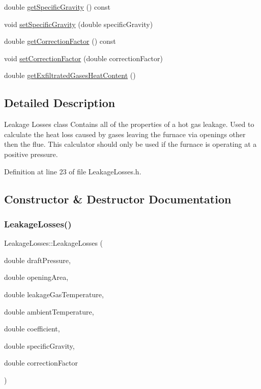 \begin{DoxyCompactItemize}
\item 
double \hyperlink{class_leakage_losses_a37cd8c2282547246bab395424dad51d9}{get\+Specific\+Gravity} () const
\item 
void \hyperlink{class_leakage_losses_ab017828413655c5903374564e8718fac}{set\+Specific\+Gravity} (double specific\+Gravity)
\item 
double \hyperlink{class_leakage_losses_ad4f289a7490cd3fd4dfc4099fc4ad562}{get\+Correction\+Factor} () const
\item 
void \hyperlink{class_leakage_losses_a1af53750d5d9573dffa8674b3479e8d6}{set\+Correction\+Factor} (double correction\+Factor)
\item 
double \hyperlink{class_leakage_losses_a9663b916752bcf39a5482674e225e4a5}{get\+Exfiltrated\+Gases\+Heat\+Content} ()
\end{DoxyCompactItemize}


\subsection{Detailed Description}
Leakage Losses class Contains all of the properties of a hot gas leakage. Used to calculate the heat loss caused by gases leaving the furnace via openings other then the flue. This calculator should only be used if the furnace is operating at a positive pressure. 

Definition at line 23 of file Leakage\+Losses.\+h.



\subsection{Constructor \& Destructor Documentation}
\mbox{\label{class_leakage_losses_ab29a3d7c9561d73f2530fc376b528510}} 
\subsubsection{\texorpdfstring{Leakage\+Losses()}{LeakageLosses()}}
{\footnotesize\ttfamily Leakage\+Losses\+::\+Leakage\+Losses (\begin{DoxyParamCaption}\item[{double}]{draft\+Pressure,  }\item[{double}]{opening\+Area,  }\item[{double}]{leakage\+Gas\+Temperature,  }\item[{double}]{ambient\+Temperature,  }\item[{double}]{coefficient,  }\item[{double}]{specific\+Gravity,  }\item[{double}]{correction\+Factor }\end{DoxyParamCaption})\hspace{0.3cm}{\ttfamily [inline]}}

